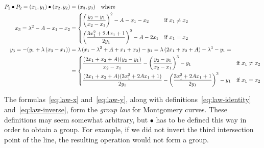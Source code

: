 \documentclass[manuscript]{acmart}
\begin{document}
\begin{align}
P_1 \bullet P_2 = (x_1, y_1) \bullet (x_2, y_2) &= (x_3, y_3) \quad\text{where}\nonumber\\
x_3 = \lambda^2 - A - x_1 - x_2 &= \begin{dcases}
\left(\frac{y_2 - y_1}{x_2 - x_1}\right)^2 - A - x_1 - x_2 & \text{if } x_1 \neq x_2 \\
\left(\frac{3x_1^2 + 2Ax_1 + 1}{2y_1}\right)^2 - A - 2x_1 & \text{if } x_1 = x_2
\end{dcases}\label{eq:law-x}\\
y_3 = -(y_1 + \lambda\,(x_3 - x_1)) &= \lambda\,(x_1 - \lambda^2 + A + x_1 + x_2) - y_1 =
\lambda\,(2x_1 + x_2 + A) - \lambda^3 - y_1 =\label{eq:law-y}\\
&= \begin{dcases}
\frac{(2x_1 + x_2 + A) (y_2 - y_1)}{x_2 - x_1} - \left(\frac{y_2 - y_1}{x_2 - x_1}\right)^3 - y_1 & \text{if } x_1 \neq x_2 \\
\frac{(2x_1 + x_2 + A) (3x_1^2 + 2Ax_1 + 1)}{2y_1} - \left(\frac{3x_1^2 + 2Ax_1 + 1}{2y_1}\right)^3 - y_1 & \text{if } x_1 = x_2
\end{dcases}\nonumber
\end{align}

The formulas~\eqref{eq:law-x} and~\eqref{eq:law-y}, along with definitions~\eqref{eq:law-identity} and~\eqref{eq:law-inverse}, form the \emph{group law} for Montgomery curves.
These definitions may seem somewhat arbitrary, but $\bullet$ has to be defined this way in order to obtain a group.
For example, if we did not invert the third intersection point of the line, the resulting operation would not form a group.
\end{document}
